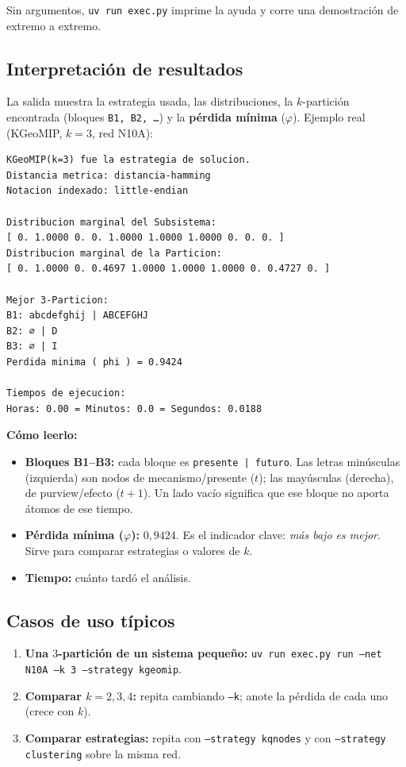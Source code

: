 \documentclass[11pt,letterpaper]{article}
\begin{document}
\noindent Sin argumentos, \texttt{uv run exec.py} imprime la ayuda y corre una
demostración de extremo a extremo.

\subsection{Interpretación de resultados}
La salida muestra la estrategia usada, las distribuciones, la $k$-partición
encontrada (bloques \texttt{B1, B2, \dots}) y la \textbf{pérdida mínima}
($\varphi$). Ejemplo real (KGeoMIP, $k=3$, red N10A):

\begin{lstlisting}[style=sh]
KGeoMIP(k=3) fue la estrategia de solucion.
Distancia metrica: distancia-hamming
Notacion indexado: little-endian

Distribucion marginal del Subsistema:
[ 0. 1.0000 0. 0. 1.0000 1.0000 1.0000 0. 0. 0. ]
Distribucion marginal de la Particion:
[ 0. 1.0000 0. 0.4697 1.0000 1.0000 1.0000 0. 0.4727 0. ]

Mejor 3-Particion:
B1: abcdefghij | ABCEFGHJ
B2: ∅ | D
B3: ∅ | I
Perdida minima ( phi ) = 0.9424

Tiempos de ejecucion:
Horas: 0.00 = Minutos: 0.0 = Segundos: 0.0188
\end{lstlisting}

\noindent\textbf{Cómo leerlo:}
\begin{itemize}
	\item \textbf{Bloques B1–B3:} cada bloque es \texttt{presente | futuro}. Las
	      letras minúsculas (izquierda) son nodos de mecanismo/presente ($t$); las
	      mayúsculas (derecha), de purview/efecto ($t{+}1$). Un lado vacío significa que
	      ese bloque no aporta átomos de ese tiempo.
	\item \textbf{Pérdida mínima ($\varphi$):} $0{,}9424$. Es el indicador clave:
	      \emph{más bajo es mejor}. Sirve para comparar estrategias o valores de $k$.
	\item \textbf{Tiempo:} cuánto tardó el análisis.
\end{itemize}

\subsection{Casos de uso típicos}
\begin{enumerate}
	\item \textbf{Una $3$-partición de un sistema pequeño:}
	      \texttt{uv run exec.py run --net N10A --k 3 --strategy kgeomip}.
	\item \textbf{Comparar $k=2,3,4$:} repita cambiando \texttt{--k}; anote la pérdida
	      de cada uno (crece con $k$).
	\item \textbf{Comparar estrategias:} repita con \texttt{--strategy kqnodes} y con
	      \texttt{--strategy clustering} sobre la misma red.
\end{enumerate}
\end{document}

